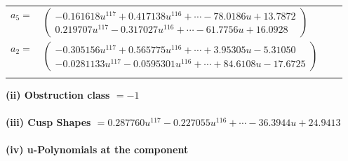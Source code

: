 \documentclass[1p]{elsarticle_modified}
\theoremstyle{definition}
\begin{document}
\begin{tabular}{m{7pt} m{180pt} m{7pt} m{180pt} }
\flushright $a_{5}=$&$\begin{pmatrix}-0.161618 u^{117}+0.417138 u^{116}+\cdots-78.0186 u+13.7872\\0.219707 u^{117}-0.317027 u^{116}+\cdots-61.7756 u+16.0928\end{pmatrix}$ \\
\flushright $a_{2}=$&$\begin{pmatrix}-0.305156 u^{117}+0.565775 u^{116}+\cdots+3.95305 u-5.31050\\-0.0281133 u^{117}-0.0595301 u^{116}+\cdots+84.6108 u-17.6725\end{pmatrix}$\\&\end{tabular}
\flushleft \textbf{(ii) Obstruction class $= -1$}\\~\\
\flushleft \textbf{(iii) Cusp Shapes $= 0.287760 u^{117}-0.227055 u^{116}+\cdots-36.3944 u+24.9413$}\\~\\
\newpage\renewcommand{\arraystretch}{1}
\flushleft \textbf{(iv) u-Polynomials at the component}\newline \\
\end{document}
